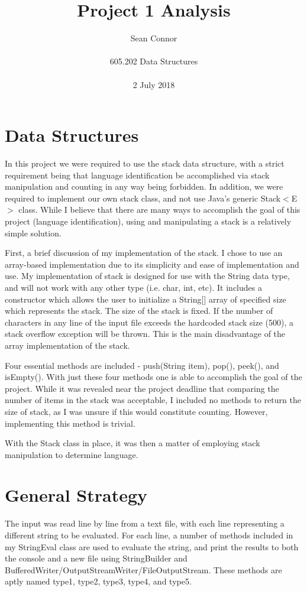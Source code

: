 \documentclass[12pt, titlepage]{article}
\title{Project 1 Analysis}
\author{Sean Connor \\ \\ 605.202 Data Structures \\ \\ 2 July 2018}
\date{}
\begin{document}
\maketitle

\section {Data Structures}

In this project we were required to use the stack data structure, with a strict requirement being that language identification be accomplished via stack manipulation and counting in any way being forbidden. In addition, we were required to implement our own stack class, and not use Java's generic Stack$<$E$>$ class. While I believe that there are many ways to accomplish the goal of this project (language identification), using and manipulating a stack is a relatively simple solution.

First, a brief discussion of my implementation of the stack. I chose to use an array-based implementation due to its simplicity and ease of implementation and use. My implementation of stack is designed for use with the String data type, and will not work with any other type (i.e. char, int, etc). It includes a constructor which allows the user to initialize a String[] array of specified size which represents the stack. The size of the stack is fixed. If the number of characters in any line of the input file exceeds the hardcoded stack size (500), a stack overflow exception will be thrown. This is the main disadvantage of the array implementation of the stack.

Four essential methods are included - push(String item), pop(), peek(), and isEmpty(). With just these four methods one is able to accomplish the goal of the project. While it was revealed near the project deadline that comparing the number of items in the stack was acceptable, I included no methods to return the size of stack, as I was unsure if this would constitute counting. However, implementing this method is trivial.

With the Stack class in place, it was then a matter of employing stack manipulation to determine language.

\section{General Strategy}

The input was read line by line from a text file, with each line representing a different string to be evaluated. For each line, a number of methods included in my StringEval class are used to evaluate the string, and print the results to both the console and a new file using StringBuilder and BufferedWriter/OutputStreamWriter/FileOutputStream. These methods are aptly named type1, type2, type3, type4, and type5. 
\end{document}
